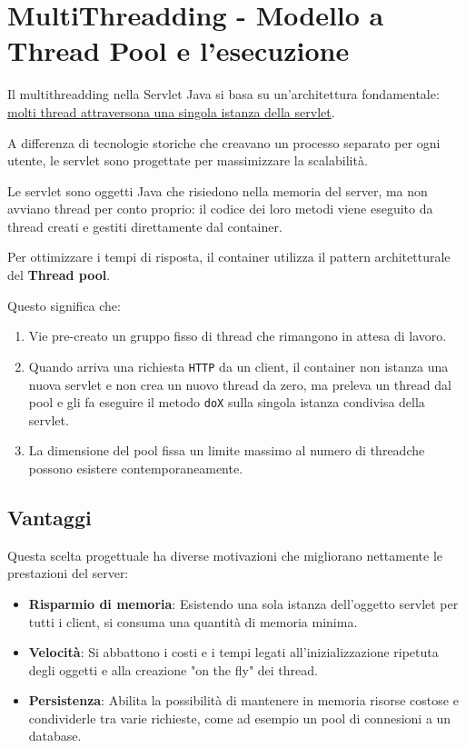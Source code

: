\section{MultiThreadding - Modello a Thread Pool e l'esecuzione}
Il multithreadding nella Servlet Java si basa su un'architettura fondamentale: \uline{molti thread attraversona una singola istanza della servlet}.

A differenza di tecnologie storiche che creavano un processo separato per ogni utente, le servlet sono progettate per massimizzare la scalabilità.

Le servlet sono oggetti Java che risiedono nella memoria del server, ma non avviano thread per conto proprio: il codice dei loro metodi viene eseguito da thread creati e gestiti direttamente dal container.

Per ottimizzare i tempi di risposta, il container utilizza il pattern architetturale del \textbf{Thread pool}.

Questo significa che:
\begin{enumerate}
    \item Vie pre-creato un gruppo fisso di thread che rimangono in attesa di lavoro.
    \item Quando arriva una richiesta \texttt{HTTP} da un client, il container non istanza una nuova servlet e non crea un nuovo thread da zero, ma preleva un thread dal pool e gli fa eseguire il metodo \texttt{doX} sulla singola istanza condivisa della servlet.
    \item La dimensione del pool fissa un limite massimo al numero di threadche possono esistere contemporaneamente.
\end{enumerate}

\subsection{Vantaggi}
Questa scelta progettuale ha diverse motivazioni che migliorano nettamente le prestazioni del server:
\begin{itemize}
    \item \textbf{Risparmio di memoria}: Esistendo una sola istanza dell'oggetto servlet per tutti i client, si consuma una quantità di memoria minima.
    \item \textbf{Velocità}: Si abbattono i costi e i tempi legati all'inizializzazione ripetuta degli oggetti e alla creazione "on the fly" dei thread.
    \item \textbf{Persistenza}: Abilita la possibilità di mantenere in memoria risorse costose e condividerle tra varie richieste, come ad esempio un pool di connesioni a un database.
\end{itemize}

